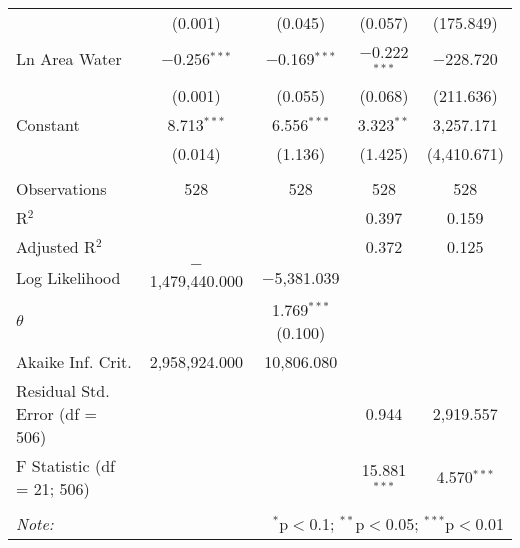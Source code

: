 \begin{table}[!htbp]
\begin{tabular}{@{\extracolsep{5pt}}lcccc}
  & (0.001) & (0.045) & (0.057) & (175.849) \\ 
  Ln Area Water & $-$0.256$^{***}$ & $-$0.169$^{***}$ & $-$0.222$^{***}$ & $-$228.720 \\ 
  & (0.001) & (0.055) & (0.068) & (211.636) \\ 
  Constant & 8.713$^{***}$ & 6.556$^{***}$ & 3.323$^{**}$ & 3,257.171 \\ 
  & (0.014) & (1.136) & (1.425) & (4,410.671) \\ 
 \hline \\[-1.8ex] 
Observations & 528 & 528 & 528 & 528 \\ 
R$^{2}$ &  &  & 0.397 & 0.159 \\ 
Adjusted R$^{2}$ &  &  & 0.372 & 0.125 \\ 
Log Likelihood & $-$1,479,440.000 & $-$5,381.039 &  &  \\ 
$\theta$ &  & 1.769$^{***}$  (0.100) &  &  \\ 
Akaike Inf. Crit. & 2,958,924.000 & 10,806.080 &  &  \\ 
Residual Std. Error (df = 506) &  &  & 0.944 & 2,919.557 \\ 
F Statistic (df = 21; 506) &  &  & 15.881$^{***}$ & 4.570$^{***}$ \\ 
\hline 
\hline \\[-1.8ex] 
\textit{Note:}  & \multicolumn{4}{r}{$^{*}$p$<$0.1; $^{**}$p$<$0.05; $^{***}$p$<$0.01} \\ 
\end{tabular} 
\end{table} 
